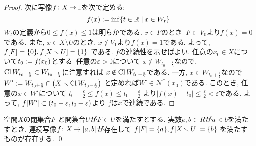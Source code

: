 \documentclass[uplatex, dvipdfmx, a4paper, 12pt, class=jsbook, crop=false]{standalone}
\begin{document}
\begin{proof}
	次に写像\( f\colon X\to\mathbb{I} \)を次で定める:
	\[ f(x) \defeq \inf  \setcomp{t \in \R}{x \in W_t} \]
	\( W_t \)の定義から\( 0 \leq f(x) \leq 1 \)は明らかである.
	\( x \in F \)のとき, \( F \subset V_0 \)より\( f(x) = 0 \)である.
	また, \( x \in X \setminus U \)のとき, \( x \notin V_1 \)より\( f(x) = 1 \)である.
	よって, \( \mapset{f}{F} = \lrbrace{0}, \mapset{f}{X \setminus U} = \lrbrace{1} \)
	である.
	\( f \)の連続性を示せばよい.
	任意の\( x_0 \in X \)について\( t_0 \mathrel{:=} f(x_0) \)とする.
	任意の\( \varepsilon > 0 \)について
	\( x \notin W_{t_0 - \frac{\varepsilon}{3}} \)なので,
	\( \mathop{\mathrm{Cl}}\nolimits W_{t_0 - \frac{\varepsilon}{2}} \subset
	W_{t_0 - \frac{\varepsilon}{3}} \)に注意すれば
	\( x \notin \mathop{\mathrm{Cl}}\nolimits W_{t_0 - \frac{\varepsilon}{2}} \)である.
	一方, \( x \in W_{t_0 + \frac{\varepsilon}{2}} \)なので
	\( W' \defeq W_{t_0 + \frac{\varepsilon}{2}} \cap
	\lrparen{X \setminus \topcl W_{t_0 - \frac{\varepsilon}{2}}} \)
	と定めれば\( W' \in \mathcal{N}^*(x_0) \)である.
	このとき, 任意の\( x \in W' \)について
	\( t_0 - \frac{\varepsilon}{2} \leq f(x) \leq t_0 + \frac{\varepsilon}{2} \)
	より\( |f(x) - t_0| \leq \frac{\varepsilon}{2} < \varepsilon \)である.
	よって, \( \mapset{f}{W'} \subset (t_0-\varepsilon, t_0 + \varepsilon) \)より
	\( f \)は\( x \)で連続である.
\end{proof}

\begin{corollary}
	 空間\( X \)の閉集合\( F \)
	と開集合\( U \)が\( F \subset U \)を満たすとする.
	実数\( a, b \in R \)が\( a < b \)を満たすとき,
	連続写像\( f\colon X\to[a,b] \)が存在して
	\( \mapset{f}{F} = \lrbrace{a}, \mapset{f}{X \setminus U} = \lrbrace{b} \)
	を満たすものが存在する.
	\qed
\end{corollary}
\end{document}
